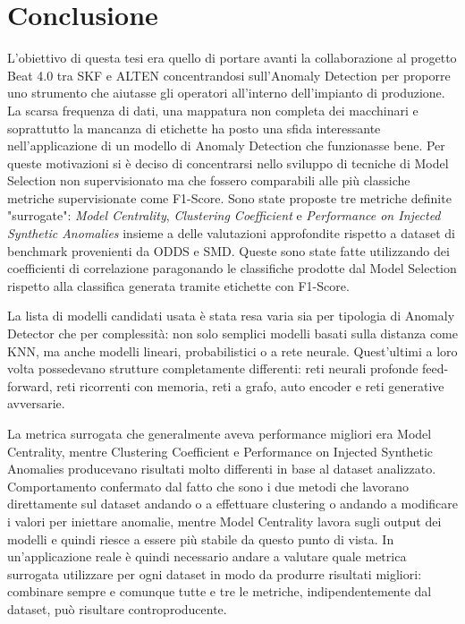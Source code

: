 \chapter{Conclusione}
\label{chap:conclusion}
L'obiettivo di questa tesi era quello di portare avanti la collaborazione al progetto Beat 4.0 tra SKF e ALTEN concentrandosi sull'Anomaly Detection per proporre uno strumento che aiutasse gli operatori all'interno dell'impianto di produzione. La scarsa frequenza di dati, una mappatura non completa dei macchinari e soprattutto la mancanza di etichette ha posto una sfida interessante nell'applicazione di un modello di Anomaly Detection che funzionasse bene.
Per queste motivazioni si è deciso di concentrarsi nello sviluppo di tecniche di Model Selection non supervisionato ma che fossero comparabili alle più classiche metriche supervisionate come F1-Score.
Sono state proposte tre metriche definite "surrogate": \textit{Model Centrality}, \textit{Clustering Coefficient} e \textit{Performance on Injected Synthetic Anomalies} insieme a delle valutazioni approfondite rispetto a dataset di benchmark provenienti da ODDS e SMD. Queste sono state fatte utilizzando dei coefficienti di correlazione paragonando le classifiche prodotte dal Model Selection rispetto alla classifica generata tramite etichette con F1-Score.

La lista di modelli candidati usata è stata resa varia sia per tipologia di Anomaly Detector che per complessità: non solo semplici modelli basati sulla distanza come KNN, ma anche modelli lineari, probabilistici o a rete neurale. Quest'ultimi a loro volta possedevano strutture completamente differenti: reti neurali profonde feed-forward, reti ricorrenti con memoria, reti a grafo, auto encoder e reti generative avversarie.

La metrica surrogata che generalmente aveva performance migliori era Model Centrality, mentre Clustering Coefficient e Performance on Injected Synthetic Anomalies producevano risultati molto differenti in base al dataset analizzato. Comportamento confermato dal fatto che sono i due metodi che lavorano direttamente sul dataset andando o a effettuare clustering o andando a modificare i valori per iniettare anomalie, mentre Model Centrality lavora sugli output dei modelli e quindi riesce a essere più stabile da questo punto di vista.
In un'applicazione reale è quindi necessario andare a valutare quale metrica surrogata utilizzare per ogni dataset in modo da produrre risultati migliori: combinare sempre e comunque tutte e tre le metriche, indipendentemente dal dataset, può risultare controproducente.


